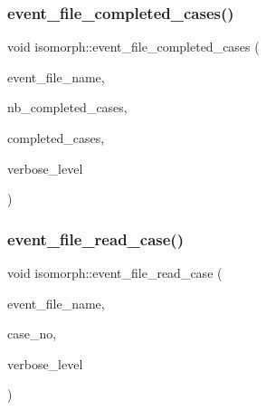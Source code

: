 \subsubsection{\texorpdfstring{event\+\_\+file\+\_\+completed\+\_\+cases()}{event\_file\_completed\_cases()}}
{\footnotesize\ttfamily void isomorph\+::event\+\_\+file\+\_\+completed\+\_\+cases (\begin{DoxyParamCaption}\item[{const \mbox{\hyperlink{galois_8h_ab6cc7b4aeb6ea31aba2b3fbfc83ff5e6}{B\+Y\+TE}} $\ast$}]{event\+\_\+file\+\_\+name,  }\item[{\mbox{\hyperlink{galois_8h_a09fddde158a3a20bd2dcadb609de11dc}{I\+NT}} \&}]{nb\+\_\+completed\+\_\+cases,  }\item[{\mbox{\hyperlink{galois_8h_a09fddde158a3a20bd2dcadb609de11dc}{I\+NT}} $\ast$}]{completed\+\_\+cases,  }\item[{\mbox{\hyperlink{galois_8h_a09fddde158a3a20bd2dcadb609de11dc}{I\+NT}}}]{verbose\+\_\+level }\end{DoxyParamCaption})}

\mbox{\label{classisomorph_a9f56fe81a94a092bf96e615864efa029}} 
\subsubsection{\texorpdfstring{event\+\_\+file\+\_\+read\+\_\+case()}{event\_file\_read\_case()}}
{\footnotesize\ttfamily void isomorph\+::event\+\_\+file\+\_\+read\+\_\+case (\begin{DoxyParamCaption}\item[{const \mbox{\hyperlink{galois_8h_ab6cc7b4aeb6ea31aba2b3fbfc83ff5e6}{B\+Y\+TE}} $\ast$}]{event\+\_\+file\+\_\+name,  }\item[{\mbox{\hyperlink{galois_8h_a09fddde158a3a20bd2dcadb609de11dc}{I\+NT}}}]{case\+\_\+no,  }\item[{\mbox{\hyperlink{galois_8h_a09fddde158a3a20bd2dcadb609de11dc}{I\+NT}}}]{verbose\+\_\+level }\end{DoxyParamCaption})}

\mbox{\label{classisomorph_ae4ccebb7facad90b52c21e06d4454587}} 
